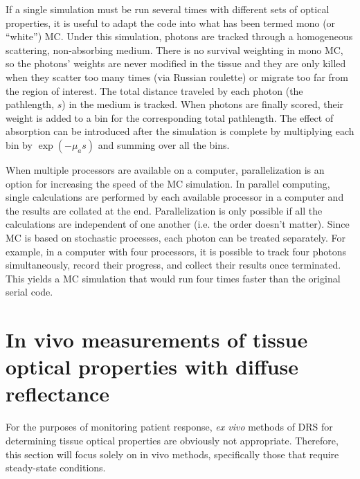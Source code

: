 If a single simulation must be run several times with different sets of optical properties, it is useful to adapt the code into what has been termed mono (or “white”) MC.\cite{Kienle1996a,Alerstam2013} Under this simulation, photons are tracked through a homogeneous scattering, non-absorbing medium. There is no survival weighting in mono MC, so the photons' weights are never modified in the tissue and they are only killed when they scatter too many times (via Russian roulette) or migrate too far from the region of interest. The total distance traveled by each photon (the pathlength, $s$) in the medium is tracked. When photons are finally scored, their weight is added to a bin for the corresponding total pathlength. The effect of absorption can be introduced after the simulation is complete by multiplying each bin by $\exp(-\mu_as)$ and summing over all the bins.

When multiple processors are available on a computer, parallelization is an option for increasing the speed of the MC simulation. In parallel computing, single calculations are performed by each available processor in a computer and the results are collated at the end. Parallelization is only possible if all the calculations are independent of one another (i.e. the order doesn't matter). Since MC is based on stochastic processes, each photon can be treated separately. For example, in a computer with four processors, it is possible to track four photons simultaneously, record their progress, and collect their results once terminated. This yields a MC simulation that would run four times faster than the original serial code.

\section{In vivo measurements of tissue optical properties with diffuse reflectance}
\label{sec:diff_refl}
For the purposes of monitoring patient response, \emph{ex vivo} methods of DRS for determining tissue optical properties are obviously not appropriate. Therefore, this section will focus solely on in vivo methods, specifically those that require steady-state conditions.

